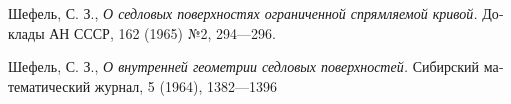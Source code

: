 \documentclass{article}
\begin{document}
\begin{thebibliography}{52}
\begin{otherlanguage}{russian}
Шефель, С. З.,
\textit{О седловых поверхностях ограниченной спрямляемой кривой.}
Доклады АН СССР, 162 (1965) №2, 
294---296.
\end{otherlanguage}

\begin{otherlanguage}{russian}
Шефель, С. З., 
\textit{О внутренней геометрии седловых поверхностей.}
Сибирский математический журнал, 5 (1964), 1382---1396
\end{otherlanguage}





\end{thebibliography}

\Addresses
\end{document}
